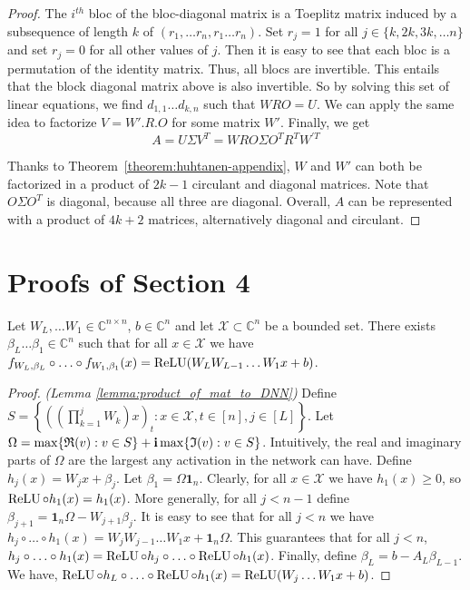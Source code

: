 \begin{proof}
The $i^{th}$ bloc of the bloc-diagonal matrix is a Toeplitz matrix induced by a subsequence of length $k$ of $(r_1,\ldots r_n,r_1 \ldots r_n)$. Set $r_{j}=1$ for all $j\in\{k,2k,3k,\ldots n\}$ and set $r_{j}=0$ for all other values of $j$. Then it is easy to see that each bloc is a permutation of the identity matrix. Thus, all blocs are invertible. This entails that the block diagonal matrix above is also invertible. So by solving this set of linear equations, we find $d_{1,1}\ldots d_{k,n}$ such that $WRO=U$. We can apply the same idea to factorize $V=W'.R.O$ for some matrix $W'$. Finally, we get 
\begin{equation}
  A = U \Sigma V^{T} = WRO \Sigma O^{T} R^{T} W^{'T}
\end{equation}

Thanks to Theorem~\ref{theorem:huhtanen-appendix}, $W$ and $W'$ can both be factorized in a product of $2k-1$ circulant and diagonal matrices.  Note that $O\Sigma O^{T}$ is diagonal, because all three are diagonal.  Overall, $A$ can be represented with a product of $4k+2$ matrices, alternatively diagonal and circulant.
\end{proof}


\section{Proofs of Section 4}

\begin{lemma}
\label{lemma:product_of_mat_to_DNN}Let $W_{L},\ldots W_{1}\in\mathbb{C}^{n\times n}$,
$b\in\mathbb{C}^{n}$ and let $\mathcal{X}\subset\mathbb{C}^{n}$
be a bounded set. There exists $\beta_{L} \ldots \beta_{1} \in \mathbb{C}^{n}$
such that for all $x \in \mathcal{X}$ we have $f_{W_{L},\beta_{L}} \circ \ldots \circ f_{W_{1},\beta_{1}}(x) = \relu \left(W_{L}W_{L-1} \ldots W_{1}x+b \right)$.
\end{lemma}

\begin{proof} \emph{(Lemma \ref{lemma:product_of_mat_to_DNN})}
Define $S=\left\{ \left(\left(\prod_{k=1}^{j}W_{k}\right)x\right)_{t}:x\in\mathcal{X},t\in[n],j\in[L]\right\} $.
Let $\Omega=\max\left\{ \mathfrak{R}(v):v\in S\right\} +\ci \max\left\{ \mathfrak{I}(v):v\in S\right\} $.
Intuitively, the real and imaginary parts of $\Omega$ are the largest any activation in the network can have.
Define $h_{j}(x) = W_{j}x + \beta_{j}$. Let $\beta_{1}=\Omega\mathbf{1}_{n}$. Clearly, for
all $x \in \mathcal{X}$ we have $h_{1}(x)\ge0$, so $\operatorname{ReLU} \circ h_{1}(x) = h_{1}(x)$.
More generally, for all $ j < n-1$ define $\beta_{j+1} = \mathbf{1}_{n} \Omega - W_{j+1} \beta_{j}$.
It is easy to see that for all $j < n$ we have $h_{j} \circ \ldots \circ h_{1}(x) = W_{j}W_{j-1} \ldots W_{1}x + \mathbf{1}_{n} \Omega$.
This guarantees that for all $j < n$, $h_{j} \circ \ldots \circ h_{1}(x) = \operatorname{ReLU} \circ h_{j} \circ \ldots \circ \operatorname{ReLU} \circ h_{1}(x)$.
Finally, define $\beta_{L} = b-A_{L} \beta_{L-1}$. We have, $\relu \circ h_{L} \circ \ldots \circ \relu \circ h_{1}(x) = \relu \left(W_{j} \ldots W_{1}x+b \right)$. 
\end{proof}

